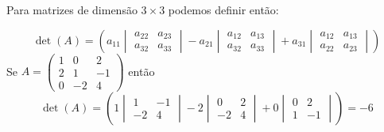 \documentclass{beamer}
\begin{document}
\begin{frame}
  Para matrizes de dimensão $3\times 3$ podemos definir então:

  $$ \det(A) = \left( a_{11}
  \begin{vmatrix}
   a_{22} & a_{23} \\
   a_{32} & a_{33}
 \end{vmatrix} -
  a_{21}
  \begin{vmatrix}
   a_{12} & a_{13} \\
   a_{32} & a_{33}
 \end{vmatrix} + a_{31}
 \begin{vmatrix}
   a_{12} & a_{13}\\
   a_{22} & a_{23}
 \end{vmatrix} \right)$$
 Se $A =\begin{pmatrix}
   1 & 0 & 2 \\ 2 & 1 & -1 \\ 0 & -2 & 4 
 \end{pmatrix}$ então
 $$ \det(A)=\left( 1
   \begin{vmatrix}
    1 & -1 \\
    -2 & 4
  \end{vmatrix} -
   2
   \begin{vmatrix}
    0 & 2 \\
    -2 & 4
  \end{vmatrix} + 0
  \begin{vmatrix}
    0 & 2\\
    1 & -1
  \end{vmatrix} \right)=-6$$

\end{frame}
\end{document}
